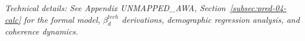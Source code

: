 \vspace{0.5em}
\noindent\textit{Technical details: See Appendix UNMAPPED_AWA, Section~\ref{subsec:pred-04-calc} for the 
formal model, $\beta_d^{tech}$ derivations, demographic regression analysis, 
and coherence dynamics.}

